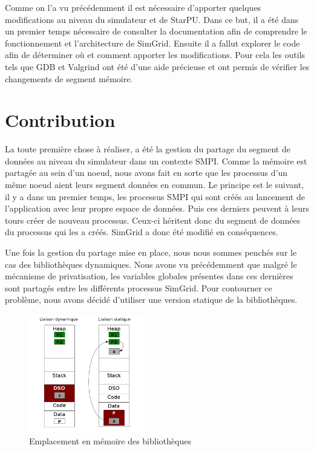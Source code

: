 \documentclass[smallextended]{svjour3}
\begin{document}
Comme on l'a vu précédemment il est nécessaire d'apporter quelques
modifications au niveau du simulateur et de StarPU. Dans ce but, il
a été dans un premier temps nécessaire de consulter la documentation
afin de comprendre le fonctionnement et l'architecture de
SimGrid. Ensuite il a fallut explorer le code afin de déterminer où
et comment apporter les modifications. Pour cela les outils tels que
GDB et Valgrind ont été d'une aide précieuse et ont permis de
vérifier les changements de segment mémoire.

\section{Contribution}
\label{sec-5}
La toute première chose à réaliser, a été la gestion du partage du
segment de données au niveau du simulateur dans un contexte
SMPI. Comme la mémoire est partagée au sein d'un noeud, nous avons
fait en sorte que les processus d'un même noeud aient leurs segment
données en commun. Le principe est le suivant, il y a dans un
premier temps, les processus SMPI qui sont créés au lancement de
l'application avec leur propre espace de données. Puis ces derniers
peuvent à leurs tours créer de nouveau processus. Ceux-ci héritent
donc du segment de données du processus qui les a créés. SimGrid a
donc été modifié en conséquences. 

Une fois la gestion du partage mise en place, nous nous sommes
penchés sur le cas des bibliothèques dynamiques. Nous avons vu
précédemment que malgré le mécanisme de privatisation, les variables
globales présentes dans ces dernières sont partagés entre les
différents processus SimGrid. Pour contourner ce problème, nous
avons décidé d'utiliser une version statique de la bibliothèques.  

\begin{figure}[htb]
\centering
\includegraphics[width=5cm]{./Img/StaticDyn.jpg}
\caption{\label{fig:3}Emplacement en mémoire des bibliothèques}
\end{figure}
\end{document}
